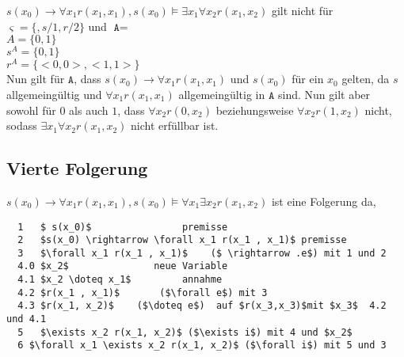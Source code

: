 $s(x_0) \rightarrow \forall x_1 r(x_1 , x_1), s(x_0) \vDash \exists x_1 \forall x_2 r(x_1,x_2)$ gilt nicht für $\varsigma = \{,s/1, r/2 \}$ und  $\texttt{A}=$\\
$A=\{0,1\}$\\
$s^A= \{0,1\}$\\
$r^A=\{<0,0>,<1,1>\}$\\


Nun gilt für $\texttt{A}$, dass $s(x_0) \rightarrow \forall x_1 r(x_1 , x_1)$ und $ s(x_0)$ für ein $x_0$ gelten, da $s$ allgemeingültig und $\forall x_1 r(x_1 , x_1)$ allgemeingültig in $\texttt{A}$ sind. Nun gilt aber sowohl für $0$ als auch $1$, dass $\forall x_2r(0,x_2)$ beziehungsweise  $\forall x_2r(1,x_2)$ nicht, sodass $\exists x_1 \forall x_2 r(x_1,x_2)$ nicht erfüllbar ist.

\subsection*{Vierte Folgerung}

$s(x_0) \rightarrow \forall x_1 r(x_1 , x_1), s(x_0) \vDash \forall x_1 \exists x_2 r(x_1,x_2)$ ist eine Folgerung da,

\begin{lstlisting}
  1   $ s(x_0)$                premisse
  2   $s(x_0) \rightarrow \forall x_1 r(x_1 , x_1)$ premisse 
  3   $\forall x_1 r(x_1 , x_1)$    ($ \rightarrow .e$) mit 1 und 2
  4.0 $x_2$               neue Variable
  4.1 $x_2 \doteq x_1$         annahme
  4.2 $r(x_1 , x_1)$       ($\forall e$) mit 3
  4.3 $r(x_1, x_2)$    ($\doteq e$)  auf $r(x_3,x_3)$mit $x_3$  4.2 und 4.1      
  5   $\exists x_2 r(x_1, x_2)$ ($\exists i$) mit 4 und $x_2$
  6 $\forall x_1 \exists x_2 r(x_1, x_2)$ ($\forall i$) mit 5 und 3
\end{lstlisting}
